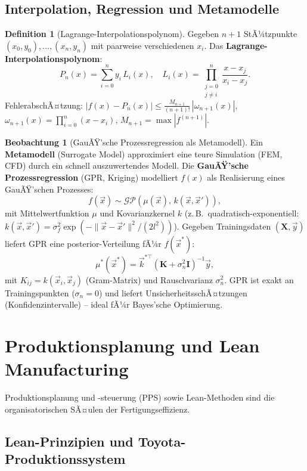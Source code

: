 ﻿\documentclass[a4paper,12pt]{report}
\theoremstyle{definition}
\newtheorem{definition}{Definition}
\newtheorem{beobachtung}{Beobachtung}
\begin{document}
\section{Interpolation, Regression und Metamodelle}

\begin{definition}[Lagrange-Interpolationspolynom]
Gegeben $n+1$ StÃ¼tzpunkte $(x_0,y_0),\ldots,(x_n,y_n)$ mit paarweise
verschiedenen $x_i$. Das \textbf{Lagrange-Interpolationspolynom}:
\[
  P_n(x) = \sum_{i=0}^n y_i\,L_i(x), \quad
  L_i(x) = \prod_{\substack{j=0\\j\neq i}}^n \frac{x-x_j}{x_i-x_j}.
\]
FehlerabschÃ¤tzung: $|f(x) - P_n(x)| \le \frac{M_{n+1}}{(n+1)!}\,|\omega_{n+1}(x)|$,
$\omega_{n+1}(x) = \prod_{i=0}^n(x-x_i)$, $M_{n+1} = \max|f^{(n+1)}|$.
\end{definition}

\begin{beobachtung}[GauÃŸ'sche Prozessregression als Metamodell]
Ein \textbf{Metamodell} (Surrogate Model) approximiert eine teure
Simulation (FEM, CFD) durch ein schnell auszuwertendes Modell.
Die \textbf{GauÃŸ'sche Prozessregression} (GPR, Kriging) modelliert
$f(x)$ als Realisierung eines GauÃŸ'schen Prozesses:
\[
  f(\vec{x}) \sim \mathcal{GP}(\mu(\vec{x}),\, k(\vec{x},\vec{x}')),
\]
mit Mittelwertfunktion $\mu$ und Kovarianzkernel $k$ (z.\,B.\ quadratisch-exponentiell:
$k(\vec{x},\vec{x}') = \sigma_f^2\exp(-\|\vec{x}-\vec{x}'\|^2/(2l^2))$).
Gegeben Trainingsdaten $(\mathbf{X},\vec{y})$ liefert GPR eine
posterior-Verteilung fÃ¼r $f(\vec{x}^*)$:
\[
  \mu^*(\vec{x}^*) = \vec{k}^{*\top}(\mathbf{K}+\sigma_n^2\mathbf{I})^{-1}\vec{y},
\]
mit $K_{ij} = k(\vec{x}_i,\vec{x}_j)$ (Gram-Matrix) und
Rauschvarianz $\sigma_n^2$. GPR ist exakt an Trainingspunkten ($\sigma_n=0$)
und liefert UnsicherheitsschÃ¤tzungen (Konfidenzintervalle) -- ideal fÃ¼r
Bayes'sche Optimierung.
\end{beobachtung}

\chapter{Produktionsplanung und Lean Manufacturing}

Produktionsplanung und -steuerung (PPS) sowie Lean-Methoden
sind die organisatorischen SÃ¤ulen der Fertigungseffizienz.

\section{Lean-Prinzipien und Toyota-Produktionssystem}
\end{document}
